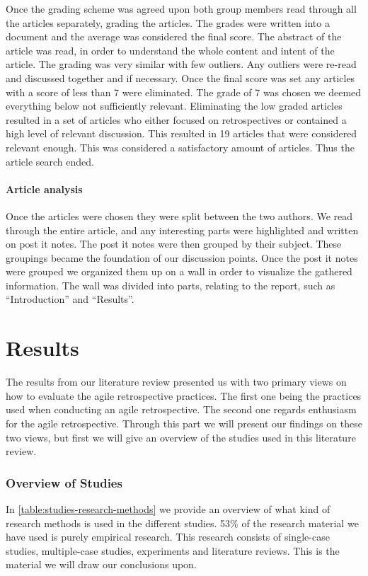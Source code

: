\documentclass[12pt]{article}
\begin{document}
Once the grading scheme was agreed upon both group members read through all the articles separately, grading the articles. The grades were written into a document and the average was considered the final score. The abstract of the article was read, in order to understand the whole content and intent of the article. The grading was very similar with few outliers. Any outliers were re-read and discussed together and if necessary. Once the final score was set any articles with a score of less than 7 were eliminated. The grade of 7 was chosen we deemed everything below not sufficiently relevant. Eliminating the low graded articles resulted in a set of articles who either focused on retrospectives or contained a high level of relevant discussion. This resulted in 19 articles that were considered relevant enough. This was considered a satisfactory amount of articles. Thus the article search ended.

\subsection{Article analysis}

Once the articles were chosen they were split between the two authors. We read through the entire article, and any interesting parts were highlighted and written on post it notes. The post it notes were then grouped by their subject. These groupings became the foundation of our discussion points. Once the post it notes were grouped we organized them up on a wall in order to visualize the gathered information. The wall was divided into parts, relating to the report, such as ``Introduction'' and ``Results''.

\clearpage

\part{Results}
The results from our literature review presented us with two primary views on how to evaluate the agile retrospective practices. The first one being the practices used when conducting an agile retrospective. The second one regards enthusiasm for the agile retrospective. Through this part we will present our findings on these two views, but first we will give an overview of the studies used in this literature review. 

\section{Overview of Studies}
In \autoref{table:studies-research-methods} we provide an overview of what kind of research methods is used in the different studies. 53\% of the research material we have used is purely empirical research. This research consists of single-case studies, multiple-case studies, experiments and literature reviews. This is the material we will draw our conclusions upon.
\end{document}
